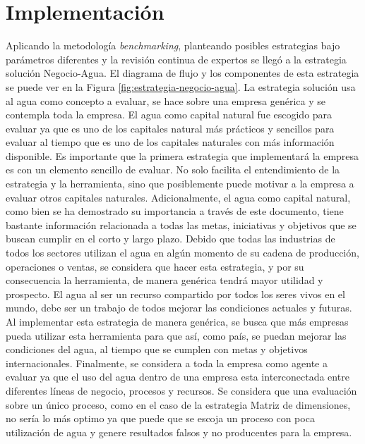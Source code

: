 \section{Implementación} \label{sec:implementacion}
Aplicando la metodología \textit{benchmarking}, planteando posibles estrategias bajo parámetros diferentes y la revisión continua de expertos se llegó a la estrategia solución Negocio-Agua. El diagrama de flujo y los componentes de esta estrategia se puede ver en la Figura \ref{fig:estrategia-negocio-agua}. La estrategia solución usa al agua como concepto a evaluar, se hace sobre una empresa genérica y se contempla toda la empresa.  El agua como capital natural fue escogido para evaluar ya que es uno de los capitales natural más prácticos y sencillos para evaluar al tiempo que es uno de los capitales naturales con más información disponible. Es importante que la primera estrategia que implementará la empresa es con un elemento sencillo de evaluar. No solo facilita el entendimiento de la estrategia y la herramienta, sino que posiblemente puede motivar a la empresa a evaluar otros capitales naturales. Adicionalmente, el agua como capital natural, como bien se ha demostrado su importancia a través de este documento, tiene bastante información relacionada a todas las metas, iniciativas y objetivos que se buscan cumplir en el corto y largo plazo.  Debido que todas las industrias de todos los sectores utilizan el agua en algún momento de su cadena de producción, operaciones o ventas, se considera que hacer esta estrategia, y por su consecuencia la herramienta, de manera genérica tendrá mayor utilidad y prospecto. El agua al ser un recurso compartido por todos los seres vivos en el mundo, debe ser un trabajo de todos mejorar las condiciones actuales y futuras. Al implementar esta estrategia de manera genérica, se busca que más empresas pueda utilizar esta herramienta para que así, como país, se puedan mejorar las condiciones del agua, al tiempo que se cumplen con metas y objetivos internacionales. Finalmente, se considera a toda la empresa como agente a evaluar ya que el uso del agua dentro de una empresa esta interconectada entre diferentes líneas de negocio, procesos y recursos. Se considera que una evaluación sobre un único proceso, como en el caso de la estrategia Matriz de dimensiones, no sería lo más optimo ya que puede que se escoja un proceso con poca utilización de agua y genere resultados falsos y no producentes para la empresa. 

